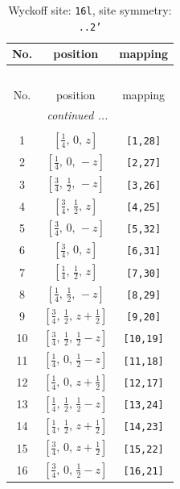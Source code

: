 \documentclass[fleqn,8pt]{jsarticle}
\begin{document}
\renewcommand{\arraystretch}{1.2}
\begin{longtable}{ccc}
\caption{Wyckoff site: {\tt 16l}, site symmetry: {\tt ..2'}}
 \\
 \hline \hline
No. & position & mapping \\ \hline \endfirsthead

\multicolumn{2}{l}{\tablename\ \thetable{}} \\
 \hline \hline
No. & position & mapping \\ \hline \endhead

 \hline \hline
\multicolumn{2}{r}{\footnotesize\it continued ...} \\ \endfoot

 \hline \hline
\multicolumn{2}{r}{} \\ \endlastfoot

1 & $\left[ \frac{1}{4},\, 0,\, z \right]$ & {\tt [1,28]} \\ \hline
2 & $\left[ \frac{1}{4},\, 0,\, - z \right]$ & {\tt [2,27]} \\ \hline
3 & $\left[ \frac{3}{4},\, \frac{1}{2},\, - z \right]$ & {\tt [3,26]} \\ \hline
4 & $\left[ \frac{3}{4},\, \frac{1}{2},\, z \right]$ & {\tt [4,25]} \\ \hline
5 & $\left[ \frac{3}{4},\, 0,\, - z \right]$ & {\tt [5,32]} \\ \hline
6 & $\left[ \frac{3}{4},\, 0,\, z \right]$ & {\tt [6,31]} \\ \hline
7 & $\left[ \frac{1}{4},\, \frac{1}{2},\, z \right]$ & {\tt [7,30]} \\ \hline
8 & $\left[ \frac{1}{4},\, \frac{1}{2},\, - z \right]$ & {\tt [8,29]} \\ \hline
9 & $\left[ \frac{3}{4},\, \frac{1}{2},\, z + \frac{1}{2} \right]$ & {\tt [9,20]} \\ \hline
10 & $\left[ \frac{3}{4},\, \frac{1}{2},\, \frac{1}{2} - z \right]$ & {\tt [10,19]} \\ \hline
11 & $\left[ \frac{1}{4},\, 0,\, \frac{1}{2} - z \right]$ & {\tt [11,18]} \\ \hline
12 & $\left[ \frac{1}{4},\, 0,\, z + \frac{1}{2} \right]$ & {\tt [12,17]} \\ \hline
13 & $\left[ \frac{1}{4},\, \frac{1}{2},\, \frac{1}{2} - z \right]$ & {\tt [13,24]} \\ \hline
14 & $\left[ \frac{1}{4},\, \frac{1}{2},\, z + \frac{1}{2} \right]$ & {\tt [14,23]} \\ \hline
15 & $\left[ \frac{3}{4},\, 0,\, z + \frac{1}{2} \right]$ & {\tt [15,22]} \\ \hline
16 & $\left[ \frac{3}{4},\, 0,\, \frac{1}{2} - z \right]$ & {\tt [16,21]} \\
\end{longtable}
\end{document}
